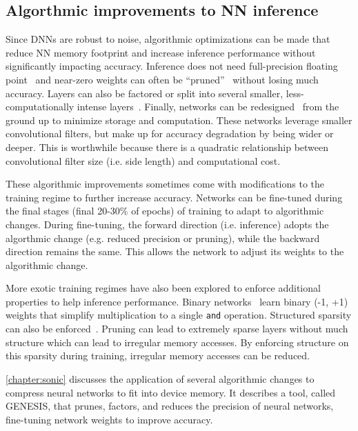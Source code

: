 \subsection{Algorthmic improvements to NN inference}
Since DNNs are robust to noise, algorithmic optimizations can be made that reduce NN memory footprint and increase inference performance without significantly impacting accuracy.
% 
Inference does not need full-precision floating point~\cite{han:isca16:eie,desa:isca17:sgd} and near-zero weights can often be ``pruned''~\cite{nabhan1994toward, han:iclr16:deep-compression,nakkiran:interspeech15:compressing,bhattacharya2016sparsification} without losing much accuracy.
% 
Layers can also be factored or split into several smaller, less-computationally intense layers~\cite{szegedy2017inception,szegedy2016rethinking,chollet2016xception}.
% 
Finally, networks can be redesigned~\cite{iandola:arxiv16:squeezenet,tan2019efficientnet,sandler2018mobilenetv2} from the ground up to minimize storage and computation.
% 
These networks leverage smaller convolutional filters, but make up for accuracy degradation by being wider or deeper.
% 
This is worthwhile because there is a quadratic relationship between convolutional filter size (i.e. side length) and computational cost.

These algorithmic improvements sometimes come with modifications to the training regime to further increase accuracy.
% 
Networks can be fine-tuned during the final stages (final 20-30\% of epochs) of training to adapt to algorithmic changes.
% 
During fine-tuning, the forward direction (i.e. inference) adopts the algorthmic change (e.g. reduced precision or pruning), while the backward direction remains the same.
% 
This allows the network to adjust its weights to the algorithmic change.

More exotic training regimes have also been explored to enforce additional properties to help inference performance.
% 
Binary networks~\cite{lin2018binary} learn binary (-1, +1) weights that simplify multiplication to a single {\tt and} operation.
% 
Structured sparsity can also be enforced~\cite{deng2018permdnn,nakkiran:interspeech15:compressing,}.
% 
Pruning can lead to extremely sparse layers without much structure which can lead to irregular memory accesses.
% 
By enforcing structure on this sparsity during training, irregular memory accesses can be reduced.

\autoref{chapter:sonic} discusses the application of several algorithmic changes to compress neural networks to fit into device memory.
%
It describes a tool, called GENESIS, that prunes, factors, and reduces the precision of neural networks, fine-tuning network weights to improve accuracy.

